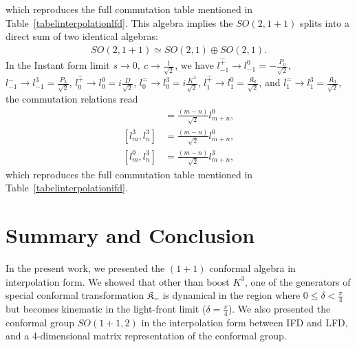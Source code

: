 \documentclass[%
 reprint,
superscriptaddress,
 amsmath,amssymb,
 aps,
]{revtex4-2}
\begin{document}
which reproduces the full commutation table mentioned in Table~\ref {tabelinterpolationlfd}. This algebra implies the $SO(2,1+1)$ splits into a direct sum of two identical algebras:
\begin{align}
    SO(2,1+1)\simeq SO(2,1)\oplus SO(2,1).
\end{align}
In the Instant form limit $s\rightarrow0,~c\rightarrow\frac{1}{\sqrt{2}}$, we have  $l^{\hat{+}}_{-1}\rightarrow l^{0}_{-1}=-\frac{P_{0}}{\sqrt{2}}$, $l^{\hat{-}}_{-1}\rightarrow l^{3}_{-1}= \frac{P_{3}}{\sqrt{2}}$, $l^{\hat{+}}_{0}\rightarrow l^{0}_{0}=i\frac{D}{\sqrt{2}}$, 
 $l^{\hat{-}}_{0}\rightarrow l^{3}_{0}= i\frac{K^{3}}{\sqrt{2}}$, $l^{\hat{+}}_{1}\rightarrow l^{0}_{1}= \frac{\mathfrak{K}_{0}}{\sqrt{2}}$, and $l^{\hat{-}}_{1}\rightarrow l^{3}_{1}= \frac{\mathfrak{K}_{3}}{\sqrt{2}}$, the commutation relations read
 \begin{align}
    [l^{0}_m,l^{0}_n]&=\frac{(m-n)}{\sqrt{2}}l^{0}_{m+n},\\
    [l^{3}_m,l^{3}_n]&=\frac{(m-n)}{\sqrt{2}}l^{0}_{m+n},\\
    [l^{0}_m,l^{3}_n]&=\frac{(m-n)}{\sqrt{2}}l^{3}_{m+n},
\end{align}
which reproduces the full commutation table mentioned in Table~\ref {tabelinterpolationifd}.



\section{Summary and Conclusion}
In the present work, we presented the $(1+1)$ conformal algebra in interpolation form. We showed that other than boost $K^{3}$, one of the generators of special conformal transformation $\mathfrak{K}_{\hat{-}}$ is dynamical in the region where $0\leq\delta<\frac{\pi}{4}$ but becomes kinematic in the light-front limit ($\delta=\frac{\pi}{4}$). We also presented the conformal group $SO(1+1,2)$ in the interpolation form between IFD and LFD, and a 4-dimensional matrix representation of the conformal group.


\acknowledgments

\appendix
\end{document}

